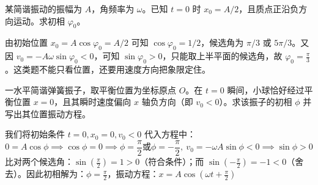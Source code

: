 \begin{exercise}[由位置和速度确定初相]
某简谐振动的振幅为 \(A\)，角频率为 \(\omega\)。已知 \(t=0\) 时 \(x_0=A/2\)，且质点正沿负方向运动。求初相 \(\varphi_0\)。
\end{exercise}

\begin{solution}
由初始位置 \(x_0=A\cos\varphi_0=A/2\) 可知 \(\cos\varphi_0=1/2\)，候选角为 \(\pi/3\) 或 \(5\pi/3\)。又因 \(v_0=-A\omega\sin\varphi_0<0\)，可知 \(\sin\varphi_0>0\)，只能取上半平面的候选角，故 \(\varphi_0=\frac{\pi}{3}\)。这类题不能只看位置，还要用速度方向把象限定住。
\end{solution}

\begin{example}
一水平简谐弹簧振子，取平衡位置为坐标原点 $O$。在 $t = 0$ 瞬间，小球恰好经过平衡位置 $x = 0$，且其瞬时速度偏向 $x$ 轴负方向（即 $v_0 < 0$）。求该振子的初相 $\phi$ 并写出其位置振动方程。
\end{example}
\begin{solution}
我们将初始条件 $t = 0, x_0 = 0, v_0 < 0$ 代入方程中：
$$0 = A \cos\phi \implies \cos\phi = 0\implies\phi = \frac{\pi}{2} \text{或} \phi = -\frac{\pi}{2},~v_0 = -\omega A \sin\phi <0 \implies\sin\phi > 0$$
比对两个候选角：$\sin\left(\frac{\pi}{2}\right) = 1 > 0$（符合条件）；而 $\sin\left(-\frac{\pi}{2}\right) = -1 < 0$（舍去）。因此初相解为：$\phi = \frac{\pi}{2}$，振动方程：$x = A \cos\left(\omega t + \frac{\pi}{2}\right)$
\end{solution}

